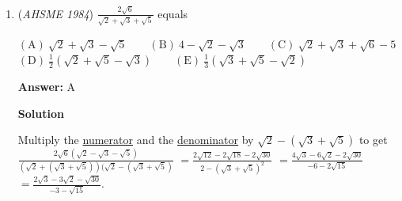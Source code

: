 \begin{enumerate}
 $a+b+c=2$ \textbf{(1)}

 $4a+2b+c=4$ \textbf{(2)}

 $9a+3b+c=8$ \textbf{(3)}

 Subtracting \textbf{(1)} from \textbf{(2)} and \textbf{(2)} from \textbf{(3)} yields the two-variable \href{https://artofproblemsolving.com/wiki/index.php?title=System\_of\_equations}{system of equations}

 $3a+b=2$ \textbf{(4)}

 $5a+b=4$ \textbf{(5)}

 We can subtract \textbf{(4)} from \textbf{(5)} to find that $2a=2$, so $a=1$. Substituting this back in yields $b=-1$, and substituting these back into one of the original equations yields $c=2$, so the closed form for the terms is

 $f(x)=x^2-x+2$, or

 $a_n=n^2-n+2$.

 Substituting in $n=100$ yields $a_{100}=100^2-100+2=9902, \boxed{\text{B}}$.

 \textbf{Alternate Solution} Term $a_{100}$ can be viewed as the first term, $2$, plus the arithmetic series $2 + 4 +\cdots + 198$.

 By summing the numbers that form the arithmetic sequence with $a_{1}$,  we get  $2 + \dfrac{2 + 198}{2}\cdot99 = 9902$.

 


	\item (\textit{AHSME 1984}) $\frac{2\sqrt{6}}{\sqrt{2}+\sqrt{3}+\sqrt{5}}$ equals


 $\mathrm{(A) \ }\sqrt{2}+\sqrt{3}-\sqrt{5} \qquad \mathrm{(B) \ }4-\sqrt{2}-\sqrt{3} \qquad \mathrm{(C) \ } \sqrt{2}+\sqrt{3}+\sqrt{6}-5 \qquad$
$\mathrm{(D) \ }\frac{1}{2}(\sqrt{2}+\sqrt{5}-\sqrt{3}) \qquad \mathrm{(E) \ } \frac{1}{3}(\sqrt{3}+\sqrt{5}-\sqrt{2})$

 \textbf{Answer: }A



\textbf{Solution}

Multiply the \href{https://artofproblemsolving.com/wiki/index.php?title=Numerator}{numerator} and the \href{https://artofproblemsolving.com/wiki/index.php?title=Denominator}{denominator} by $\sqrt{2}-(\sqrt{3}+\sqrt{5})$ to get $\frac{2\sqrt{6}(\sqrt{2}-\sqrt{3}-\sqrt{5})}{(\sqrt{2}+(\sqrt{3}+\sqrt{5}))(\sqrt{2}-(\sqrt{3}+\sqrt{5})}$
$=\frac{2\sqrt{12}-2\sqrt{18}-2\sqrt{30}}{2-(\sqrt{3}+\sqrt{5})^2}$
$=\frac{4\sqrt{3}-6\sqrt{2}-2\sqrt{30}}{-6-2\sqrt{15}}$
$=\frac{2\sqrt{3}-3\sqrt{2}-\sqrt{30}}{-3-\sqrt{15}}$.


\end{enumerate}
